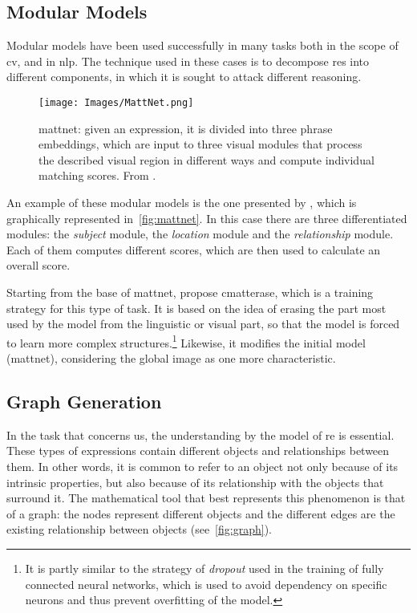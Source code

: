 \subsection{Modular Models}\label{sec:modular}
Modular models have been used successfully in many tasks both in the scope of
\gls{cv}, and in \gls{nlp}. The technique used in these cases is to decompose
\glspl{re} into different components, in which it is sought to attack different
reasoning.

\begin{figure}[ht]
  \centering
  \texttt{[image: Images/MattNet.png]}
  \caption[]{\gls{mattnet}: given an expression, it is
    divided into three phrase embeddings, which are input to three visual
    modules that process the described visual region in different ways and
    compute individual matching scores. From .}%
  \label{fig:mattnet}
\end{figure}

An example of these modular models is the one presented by ,
which is graphically represented in\ \vref{fig:mattnet}. In this case there are
three differentiated modules: the \emph{subject} module, the \emph{location}
module and the \emph{relationship} module. Each of them computes different
scores, which are then used to calculate an overall score.

Starting from the base of \gls{mattnet},
 propose
\gls{cmatterase}, which is a training strategy for this type of task. It is
based on the idea of erasing the part most used by the model from the
linguistic or visual part, so that the model is forced to learn more complex
structures.\footnote{It is partly similar to the strategy of \emph{dropout}
  used in the training of fully connected neural networks, which is used to
  avoid dependency on specific neurons and thus prevent overfitting of the
  model.} Likewise, it modifies the initial model (\gls{mattnet}), considering
the global image as one more characteristic.


\subsection{Graph Generation}\label{sec:graph}
In the task that concerns us, the understanding by the model of \gls{re} is
essential. These types of expressions contain different objects and
relationships between them. In other words, it is common to refer to an object
not only because of its intrinsic properties, but also because of its
relationship with the objects that surround it. The mathematical tool that best
represents this phenomenon is that of a graph: the nodes represent different
objects and the different edges are the existing relationship between objects
(see\ \vref{fig:graph}).

